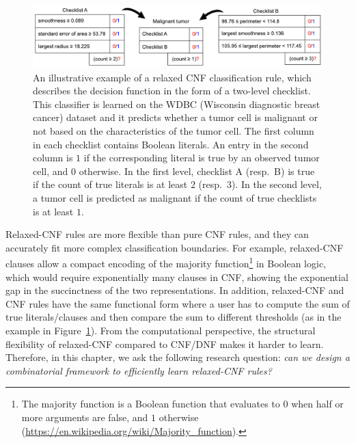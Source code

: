 \begin{figure}
	\begin{center}
		\includegraphics[scale=.62]{figures/interpretability/relaxed-cnf/checklist.pdf}
	\end{center}
	\caption[Illustration of a relaxed-CNF classification rule]{An illustrative example of a  relaxed CNF classification rule, which describes the decision function in the form of a  two-level checklist. This classifier is learned on the WDBC (Wisconsin diagnostic breast cancer) dataset and it predicts whether a tumor cell is malignant or not based on the characteristics of the  tumor cell. The first column in each checklist contains Boolean literals. An entry in the second column is  $ 1 $ if the corresponding literal is true by an observed tumor cell, and $ 0 $ otherwise. In the first level, checklist A (resp.\ B) is true if the count of true  literals is at least $ 2 $ (resp.\ $ 3 $). In the second level, a tumor cell is predicted as malignant if the count of true checklists is at least $ 1 $. }
	\label{interpretability_crr_exmpl:wdbc}
\end{figure}




 {Relaxed-CNF rules are  more flexible than pure CNF rules, and they can accurately fit more complex classification boundaries.} For example, relaxed-CNF clauses  allow  a compact encoding of the majority function\footnote{The majority function is a Boolean function that evaluates to $ 0 $ when half or more arguments are false, and $ 1 $ otherwise (\url{https://en.wikipedia.org/wiki/Majority_function}).} in Boolean logic, which would require exponentially many clauses in CNF, showing the exponential gap in the succinctness of the two representations.  In addition, relaxed-CNF and CNF rules have the same functional form where a user has to compute the sum of true literals/clauses  and then compare the sum  to  different thresholds {(as in the example in Figure~\ref{interpretability_crr_exmpl:wdbc})}. From the computational perspective, the structural flexibility of relaxed-CNF compared to CNF/DNF makes it harder to learn. Therefore, in this chapter, we ask the following research question: \textit{can we design a combinatorial framework to efficiently learn relaxed-CNF rules?}

